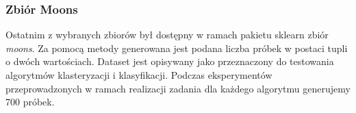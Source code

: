\documentclass{classrep}
\begin{document}
{{            \subsubsection{Zbiór Moons}
            \label{opis_zbiorow_intro_moons} {
                Ostatnim z wybranych zbiorów był dostępny w ramach pakietu sklearn
                zbiór \textit{moons}. Za pomocą metody generowana jest podana liczba
                próbek w postaci tupli o dwóch wartościach. Dataset jest opisywany jako
                przeznaczony do testowania algorytmów klasteryzacji i klasyfikacji.
                Podczas eksperymentów przeprowadzonych w ramach realizacji zadania dla
                każdego algorytmu generujemy 700 próbek.
            }

        }

    }
    \newpage
\end{document}
